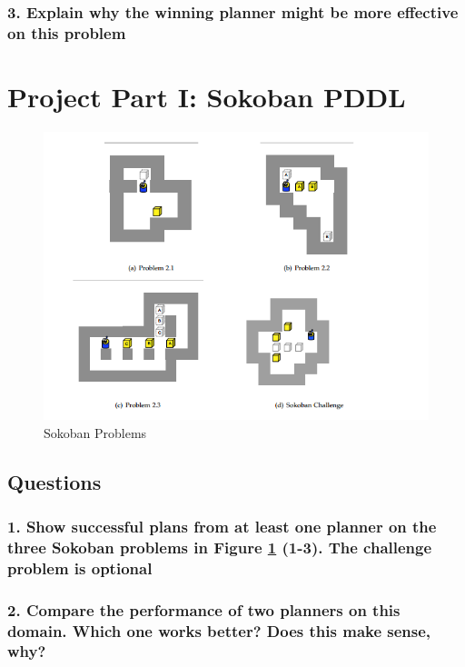 \documentclass[10pt, letter]{article}
\begin{document}
\subsubsection*{3. Explain why the winning planner might be more effective on this problem}


\section{Project Part I: Sokoban PDDL}
\begin{figure}[h!]
  \centering
    \includegraphics[scale = 0.3]{images/sokoban}
    \caption{Sokoban Problems}
  \label{fig2}
\end{figure}

\subsection{Questions}
\subsubsection*{1. Show successful plans from at least one planner on the three Sokoban problems in Figure \ref{fig2}
(1-3). The challenge problem is optional}
\subsubsection*{2. Compare the performance of two planners on this domain. Which one works better? Does this
make sense, why?}
\end{document}
